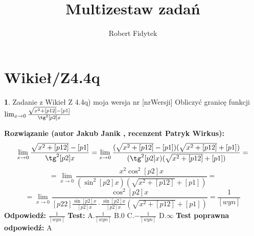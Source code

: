 \documentclass[12pt, a4paper]{article}
\title{Multizestaw zadań}
\author{Robert Fidytek}
\date{}
\theoremstyle{definition} %
\newtheorem{zad}{}
\newcommand{\kategoria}[1]{\section{#1}} %
\newcommand{\zadStart}[1]{\begin{zad}#1\newline} %
\newcommand{\zadStop}{\end{zad}}   %
\newcommand{\rozwStart}[2]{\noindent \textbf{Rozwiązanie (autor #1 , recenzent #2): }\newline} %
\newcommand{\rozwStop}{\newline}                                            %
\newcommand{\odpStart}{\noindent \textbf{Odpowiedź:}\newline}    %
\newcommand{\odpStop}{\newline}                                             %
\newcommand{\testStart}{\noindent \textbf{Test:}\newline} %
\newcommand{\testStop}{\newline} %
\newcommand{\kluczStart}{\noindent \textbf{Test poprawna odpowiedź:}\newline} %
\newcommand{\kluczStop}{\newline} %
\begin{document}
\maketitle


\kategoria{Wikieł/Z4.4q}
\zadStart{Zadanie z Wikieł Z 4.4q) moja wersja nr [nrWersji]}
Obliczyć granicę funkcji $\lim_{x \to 0} \frac{\sqrt{x^2+[p12]}-[p1]}{\tg^2{[p2]x}}$
\zadStop
\rozwStart{Jakub Janik}{Patryk Wirkus}
$$\lim_{x \to 0} \frac{\sqrt{x^2+[p12]}-[p1]}{\tg^2{[p2]x}}=\lim_{x \to 0} \frac{(\sqrt{x^2+[p12]}-[p1])(\sqrt{x^2+[p12]}+[p1])}{(\tg^2{[p2]x})(\sqrt{x^2+[p12]}+[p1])}=$$
$$=\lim_{x \to 0} \frac{x^2\cos^2{[p2]x}}{(\sin^2{[p2]x})(\sqrt{x^2+[p12]}+[p1])}=$$
$$=\lim_{x \to 0} \frac{\cos^2{[p2]x}}{[p22]\frac{\sin{[p2]x}}{[p2]x}\cdot\frac{\sin{[p2]x}}{[p2]x}(\sqrt{x^2+[p12]}+[p1])}=\frac{1}{[wyn]}$$
\rozwStop
\odpStart
$\frac{1}{[wyn]}$
\odpStop
\testStart
A.$\frac{1}{[wyn]}$
B.$0$
C.$-\frac{1}{[wyn]}$
D.$\infty$
\testStop
\kluczStart
A
\kluczStop
\end{document}
